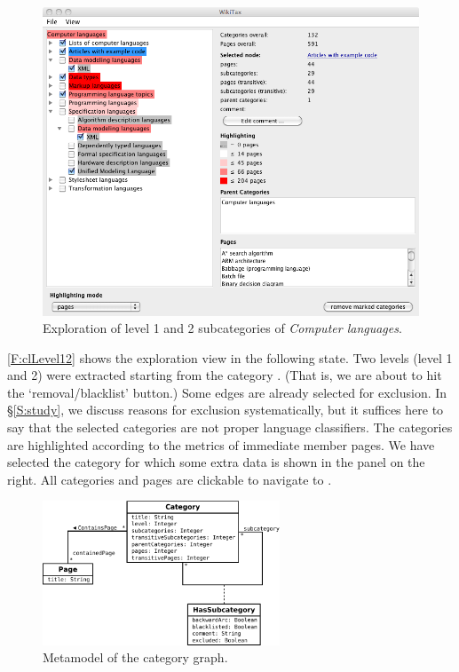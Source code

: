\begin{figure}[t!]
\begin{center}
\includegraphics[width=.84\textwidth]{figures/clLevel12.png}
\end{center}
\vspace{-66\in}
\caption{Exploration of level 1 and 2 subcategories of \emph{Computer languages}.}
\label{F:clLevel12}
\vspace{-42\in}
\end{figure}


\autoref{F:clLevel12} shows the \WikiTax{} exploration view in the following state.
Two levels (level 1 and 2) were extracted starting from the category . (That is, we are about to hit the `removal/blacklist' button.) Some edges are already selected for exclusion. In \S\ref{S:study}, we discuss reasons for exclusion systematically, but it suffices here to say that the selected categories are not proper language classifiers. The categories are highlighted according to the metrics of immediate member pages. We have selected the category  for which some extra data is shown in the panel on the right. All categories and pages are clickable to navigate to \Wikipedia.


\begin{figure}[ht]
\centering
\includegraphics[width=0.63\textwidth]{../manual/figures/full_schema.pdf} 
\caption{Metamodel of the \WikiTax{} category graph.}
\label{F:metamodel}
\vspace{-42\in}
\end{figure}

